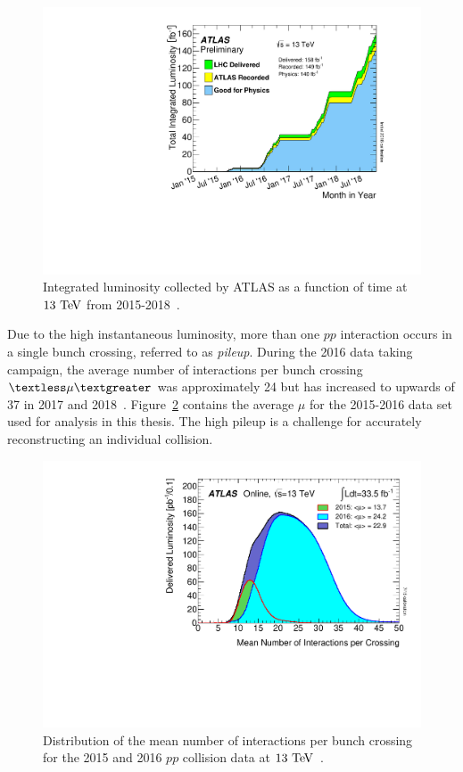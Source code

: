 \begin{figure}
  \centering
  \includegraphics[width=.6\textwidth]{figs/detector/intLumiVsTimeRun2}
  \caption[Integrated luminosity collected by ATLAS as a function of time at $13\tev$ from 2015-2018.]{Integrated luminosity collected by ATLAS as a function of time at $13\tev$ from 2015-2018~\cite{2019.atlas-lumi-plots}.}
  \label{fig:atlas_integrated_lumi}
\end{figure}

Due to the high instantaneous luminosity, more than one $pp$ interaction occurs in a single bunch crossing, referred to as \emph{pileup}.
During the 2016 data taking campaign, the average number of interactions per bunch crossing $\textless\mu\textgreater$ was approximately 24 but has increased to upwards of 37 in 2017 and 2018~\cite{2019.atlas-lumi-plots}.
Figure~\ref{fig:detector_pileup} contains the average $\mu$ for the 2015-2016 data set used for analysis in this thesis.
The high pileup is a challenge for accurately reconstructing an individual collision.

\begin{figure}
  \centering
  \includegraphics[width=.6\textwidth]{figs/detector/meanInteractionsPerCrossing}
  \caption[Distribution of the mean number of interactions per bunch crossing for the 2015 and 2016 $pp$ collision data at $13\tev$.]{Distribution of the mean number of interactions per bunch crossing for the 2015 and 2016 $pp$ collision data at $13\tev$~\cite{2019.atlas-lumi-plots}.}
  \label{fig:detector_pileup}
\end{figure}
